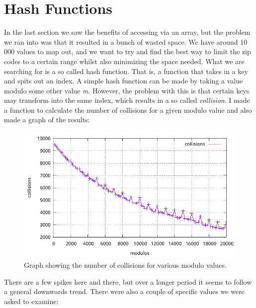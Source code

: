\documentclass[a4paper, 11pt]{article}
\begin{document}
\section{Hash Functions}
	In the last section we saw the benefits of accessing via an array, but the problem we ran into was that it resulted in a bunch of wasted space.
	We have around 10 000 values to map out, and we want to try and find the best way to limit the zip codes to a certain range whilst also minimizing the space needed.
	What we are searching for is a so called hash function.
	That is, a function that takes in a key and spits out an index.
	A simple hash function can be made by taking a value modulo some other value \textit{m}.
	However, the problem with this is that certain keys may transform into the same index, which results in a so called \textit{collision}.
	I made a function to calculate the number of collisions for a given modulo value and also made a graph of the results:
	\begin{figure}[H]
		\centering
		\includegraphics[scale=0.8]{graphs/collisions.pdf}
		\caption{
			Graph showing the number of collisions for various modulo values.
		}
	\end{figure}
	There are a few spikes here and there, but over a longer period it seems to follow a general downwards trend.
	There were also a couple of specific values we were asked to examine:
\end{document}
